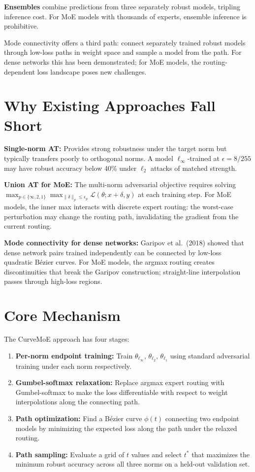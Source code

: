 \documentclass[10pt,twocolumn]{article}
\begin{document}
\textbf{Ensembles} combine predictions from three separately robust
models, tripling inference cost. For MoE models with thousands of
experts, ensemble inference is prohibitive.

Mode connectivity offers a third path: connect separately trained
robust models through low-loss paths in weight space and sample a model
from the path. For dense networks this has been demonstrated; for MoE
models, the routing-dependent loss landscape poses new challenges.

\section{Why Existing Approaches Fall Short}

\textbf{Single-norm AT:} Provides strong robustness under the target
norm but typically transfers poorly to orthogonal norms. A model
$\ell_\infty$-trained at $\epsilon = 8/255$ may have robust accuracy
below 40\% under $\ell_2$ attacks of matched strength.

\textbf{Union AT for MoE:} The multi-norm adversarial objective requires
solving $\max_{p \in \{\infty,2,1\}} \max_{\|\delta\|_p \leq \epsilon_p}
\mathcal{L}(\theta; x+\delta, y)$ at each training step. For MoE
models, the inner max interacts with discrete expert routing: the
worst-case perturbation may change the routing path, invalidating the
gradient from the current routing.

\textbf{Mode connectivity for dense networks:} Garipov et al.\ (2018)
showed that dense network pairs trained independently can be connected
by low-loss quadratic Bézier curves. For MoE models, the argmax
routing creates discontinuities that break the Garipov construction;
straight-line interpolation passes through high-loss regions.

\section{Core Mechanism}

The CurveMoE approach has four stages:

\begin{enumerate}[itemsep=2pt,parsep=0pt]
  \item \textbf{Per-norm endpoint training:} Train $\theta_{\ell_\infty}$,
    $\theta_{\ell_2}$, $\theta_{\ell_1}$ using standard adversarial
    training under each norm respectively.
  \item \textbf{Gumbel-softmax relaxation:} Replace argmax expert
    routing with Gumbel-softmax to make the loss differentiable with
    respect to weight interpolations along the connecting path.
  \item \textbf{Path optimization:} Find a Bézier curve $\phi(t)$
    connecting two endpoint models by minimizing the expected loss
    along the path under the relaxed routing.
  \item \textbf{Path sampling:} Evaluate a grid of $t$ values and
    select $t^*$ that maximizes the minimum robust accuracy across all
    three norms on a held-out validation set.
\end{enumerate}
\end{document}
